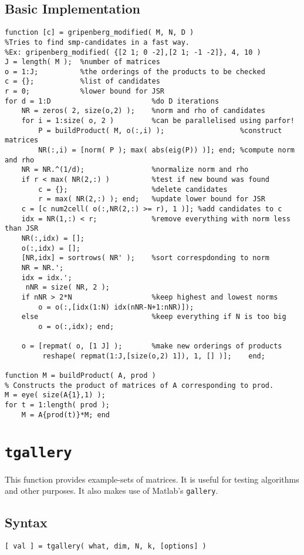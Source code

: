\subsection{Basic Implementation}
\begin{verbatim}
function [c] = gripenberg_modified( M, N, D )
%Tries to find smp-candidates in a fast way.
%Ex: gripenberg_modified( {[2 1; 0 -2],[2 1; -1 -2]}, 4, 10 )
J = length( M );  %number of matrices
o = 1:J;          %the orderings of the products to be checked
c = {};           %list of candidates
r = 0;            %lower bound for JSR
for d = 1:D                        %do D iterations
    NR = zeros( 2, size(o,2) );    %norm and rho of candidates
    for i = 1:size( o, 2 )         %can be parallelised using parfor!
        P = buildProduct( M, o(:,i) );                  %construct matrices
        NR(:,i) = [norm( P ); max( abs(eig(P)) )]; end; %compute norm and rho
    NR = NR.^(1/d);                %normalize norm and rho
    if r < max( NR(2,:) )          %test if new bound was found
        c = {};                    %delete candidates
        r = max( NR(2,:) ); end;   %update lower bound for JSR
    c = [c num2cell( o(:,NR(2,:) >= r), 1 )]; %add candidates to c
    idx = NR(1,:) < r;             %remove everything with norm less than JSR
    NR(:,idx) = []; 
    o(:,idx) = [];
    [NR,idx] = sortrows( NR' );    %sort correspdonding to norm
    NR = NR.'; 
    idx = idx.';
     nNR = size( NR, 2 ); 
    if nNR > 2*N                   %keep highest and lowest norms
        o = o(:,[idx(1:N) idx(nNR-N+1:nNR)]); 
    else                           %keep everything if N is too big
        o = o(:,idx); end;      

    o = [repmat( o, [1 J] );       %make new orderings of products    
         reshape( repmat(1:J,[size(o,2) 1]), 1, [] )];    end;

function M = buildProduct( A, prod )
% Constructs the product of matrices of A corresponding to prod.
M = eye( size(A{1},1) );
for t = 1:length( prod ); 
    M = A{prod(t)}*M; end
\end{verbatim}

\section{\texttt{tgallery}}\label{tgallery}
This function provides example-sets of matrices.
It is useful for testing algorithms and other purposes. 
It also makes use of Matlab's \texttt{gallery}.
\subsection*{Syntax}
\begin{param}
\item \texttt{[ val ] = tgallery( what, dim, N, k, [options] )}
\end{param}
